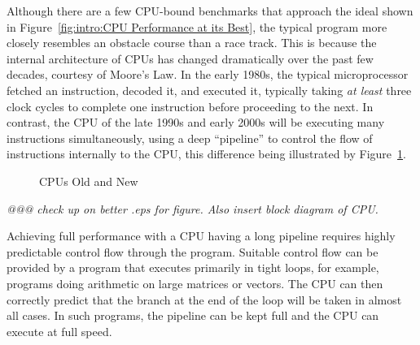 Although there are a few CPU-bound benchmarks that approach the ideal
shown in Figure~\ref{fig:intro:CPU Performance at its Best},
the typical program more closely resembles an obstacle course than
a race track.
This is because the internal architecture of CPUs has changed dramatically
over the past few decades, courtesy of Moore's Law.
In the early 1980s, the typical microprocessor fetched an instruction,
decoded it, and executed it, typically taking \emph{at least} three
clock cycles to complete one instruction before proceeding to the next.
In contrast, the CPU of the late 1990s and early 2000s will be executing
many instructions simultaneously, using a deep ``pipeline'' to control
the flow of instructions internally to the CPU, this difference being
illustrated by Figure~\ref{fig:intro:CPUs Old and New}.

\begin{figure}[htb]
\begin{center}
\end{center}
\caption{CPUs Old and New}
\label{fig:intro:CPUs Old and New}
\end{figure}

\emph{@@@ check up on better .eps for figure.  Also insert block diagram
of CPU.}

Achieving full performance with a CPU having a long pipeline requires
highly predictable control flow through the program.
Suitable control flow can be provided by a program that executes primarily
in tight loops, for example, programs doing arithmetic on large matrices
or vectors.
The CPU can then correctly predict that the branch at the end of the loop
will be taken in almost all cases.
In such programs, the pipeline can be kept full and the CPU can execute
at full speed.

